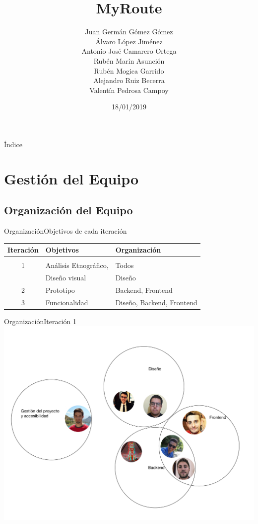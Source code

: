 \documentclass{beamer}
\title{MyRoute}
\author[GARVAM]{Juan Germ\'an G\'omez G\'omez \\ \'Alvaro L\'opez Jim\'enez \\ Antonio Jos\'e Camarero Ortega \\ Rub\'en Mar\'in Asunci\'on \\ Rub\'en Mogica Garrido \\ Alejandro Ruiz Becerra \\ Valent\'in Pedrosa Campoy}
\date{18/01/2019}
\begin{document}
\begin{frame}
  \titlepage 
\end{frame}

\begin{frame}{\'Indice}
  \tiny 
  \tableofcontents
\end{frame}

\section{Gesti\'on del Equipo}

\subsection{Organizaci\'on del Equipo}

\begin{frame}{Organizaci\'on}{Objetivos de cada iteraci\'on}
  \begin{tabular}{cll}
  Iteraci\'on  & Objetivos & Organizaci\'on \\\hline \\
  1  &  An\'alisis Etnogr\'afico,  & Todos \\
     &  Dise\~no visual            & Dise\~no\\[0.3cm]
  2  &  Prototipo  & Backend, Frontend \\[0.3cm]
  3  &  Funcionalidad & Dise\~no, Backend, Frontend
  \end{tabular}
\end{frame}


\begin{frame}{Organizaci\'on}{Iteraci\'on 1}
\includegraphics[scale=0.1]{images_latex/org_itr1}
\end{frame}
\end{document}
